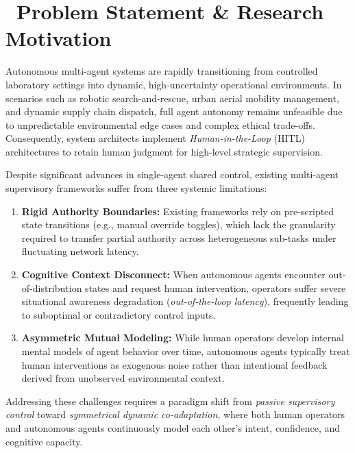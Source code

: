 \documentclass[11pt,a4paper]{scrartcl}
\begin{document}
\vspace{12pt}

\section{\texorpdfstring{\faExclamationCircle\ }{ }Problem Statement \& Research Motivation}

Autonomous multi-agent systems are rapidly transitioning from controlled laboratory settings into dynamic, high-uncertainty operational environments. In scenarios such as robotic search-and-rescue, urban aerial mobility management, and dynamic supply chain dispatch, full agent autonomy remains unfeasible due to unpredictable environmental edge cases and complex ethical trade-offs. Consequently, system architects implement \emph{Human-in-the-Loop} (HITL) architectures to retain human judgment for high-level strategic supervision.

Despite significant advances in single-agent shared control, existing multi-agent supervisory frameworks suffer from three systemic limitations:
\begin{enumerate}[label=\textbf{P\arabic*.}, leftmargin=2em, itemsep=3pt]
    \item \textbf{Rigid Authority Boundaries:} Existing frameworks rely on pre-scripted state transitions (e.g., manual override toggles), which lack the granularity required to transfer partial authority across heterogeneous sub-tasks under fluctuating network latency.
    \item \textbf{Cognitive Context Disconnect:} When autonomous agents encounter out-of-distribution states and request human intervention, operators suffer severe situational awareness degradation (\emph{out-of-the-loop latency}), frequently leading to suboptimal or contradictory control inputs.
    \item \textbf{Asymmetric Mutual Modeling:} While human operators develop internal mental models of agent behavior over time, autonomous agents typically treat human interventions as exogenous noise rather than intentional feedback derived from unobserved environmental context.
\end{enumerate}

Addressing these challenges requires a paradigm shift from \emph{passive supervisory control} toward \emph{symmetrical dynamic co-adaptation}, where both human operators and autonomous agents continuously model each other's intent, confidence, and cognitive capacity.
\end{document}
